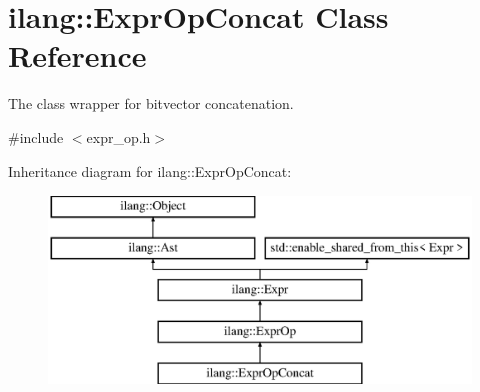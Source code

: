 \hypertarget{classilang_1_1_expr_op_concat}{}\section{ilang\+:\+:Expr\+Op\+Concat Class Reference}
\label{classilang_1_1_expr_op_concat}


The class wrapper for bitvector concatenation.  




{\ttfamily \#include $<$expr\+\_\+op.\+h$>$}

Inheritance diagram for ilang\+:\+:Expr\+Op\+Concat\+:\begin{figure}[H]
\begin{center}
\leavevmode
\includegraphics[height=5.000000cm]{classilang_1_1_expr_op_concat}
\end{center}
\end{figure}
